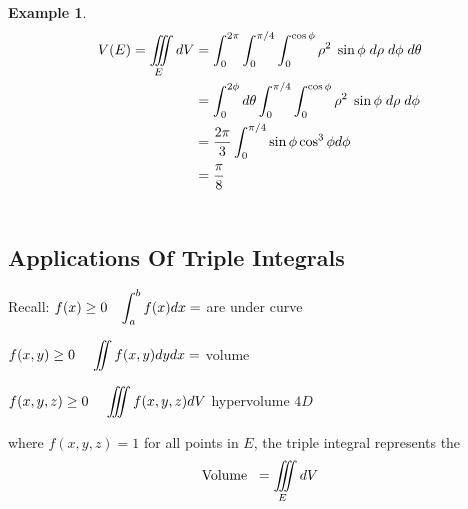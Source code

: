 \documentclass[11pt,a4paper]{article}
\theoremstyle{definition}
\newtheorem{exa}[thm]{Example}
\begin{document}
\begin{exa}
\begin{align*}
V(E) = \iiint\limits_EdV & = \int^{2\pi}_0\int^{\pi/4}_0 \int^{\cos \phi}_0 \rho^2 \hspace{0.1cm} \sin \phi \hspace{0.1cm} d\rho\hspace{0.1cm} d\phi\hspace{0.1cm} d\theta\\
& = \int^{2\phi}_0d\theta \int^{\pi/4}_0\int^{\cos \phi}_0\rho^2 \hspace{0.1cm} \sin \phi \hspace{0.1cm} d\rho\hspace{0.1cm} d\phi\\
& = \frac{2\pi}{3}\int^{\pi/4}_0 \sin \phi \cos^3 \phi d\phi\\
& = \frac{\pi}{8}\\\\
\end{align*}
\end{exa}

{\color[wave]{485}\subsection{Applications Of Triple Integrals}}

Recall: $\displaystyle{f(x)\geq 0\hspace{0.3cm} \int^b_a f(x)dx = }$ are under curve


$\displaystyle{  f(x,y)\geq 0\hspace{0.4cm} \iint f(x,y) dy dx= }$ volume


$\displaystyle{f(x,y,z) \geq 0\hspace{0.4cm} \iiint f(x,y,z)dV}$ hypervolume $4D$


where $f(x,y,z) = 1$ for all points in $E$, the triple integral represents the $$\text{Volume}\hspace{0.2cm} = \iiint\limits_E dV$$
\end{document}
